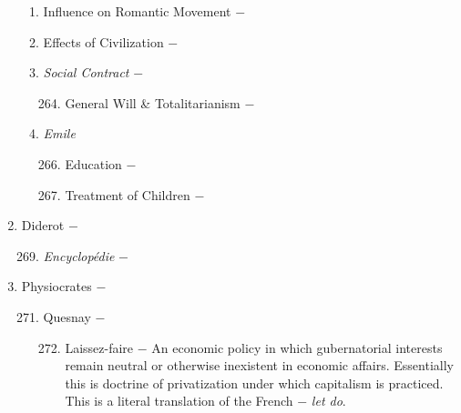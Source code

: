 \documentclass[12pt]{article}
\begin{document}
\begin{enumerate}
\begin{enumerate}[label=\arabic{*}.]
\item Influence on Romantic Movement $-$ 

\item Effects of Civilization $-$

\item \textit{Social Contract} $-$

\begin{enumerate}[label=\arabic{*}.]
\setcounter{enumiii}{263}

\item General Will \& Totalitarianism $-$

\end{enumerate}
\setcounter{enumii}{264}

\item \textit{Emile}

\begin{enumerate}[label=\arabic{*}.]
\setcounter{enumiii}{265}

\item Education $-$ 

\item Treatment of Children $-$

\end{enumerate}
\end{enumerate}
\setcounter{enumi}{267}

\item Diderot $-$ 

\begin{enumerate}[label=\arabic{*}.]
\setcounter{enumii}{268}

\item \textit{Encyclop\'edie} $-$ 

\end{enumerate}
\setcounter{enumi}{269}

\item Physiocrates $-$

\begin{enumerate}[label=\arabic{*}.]
\setcounter{enumii}{270}

\item Quesnay $-$ 

\begin{enumerate}[label=\arabic{*}.]
\setcounter{enumiii}{271}

\item Laissez-faire $-$ An economic policy in which gubernatorial interests remain neutral or otherwise inexistent in economic affairs. Essentially this is doctrine of privatization under which capitalism is practiced. This is a literal translation of the French $-$ \textit{let do}.


\end{enumerate}
\end{enumerate}
\end{enumerate}
\end{document}
